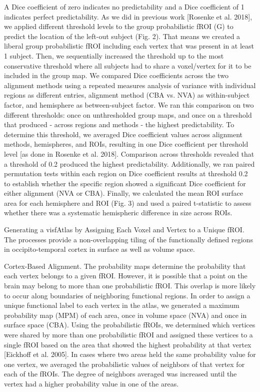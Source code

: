 A Dice coefficient of zero indicates no predictability and a Dice coefficient of
1 indicates perfect predictability.
%
As we did in previous work [Rosenke et al. 2018], we applied different threshold
levels to the group probabilistic fROI (G) to predict the location of the
left-out subject (Fig. 2).
%
That means we created a liberal group probabilistic fROI including each vertex
that was present in at least 1 subject.
%
Then, we sequentially increased the threshold up to the most conservative
threshold where all subjects had to share a voxel/vertex for it to be included
in the group map.
%
We compared Dice coefficients across the two alignment methods using a repeated
measures analysis of variance with individual regions as different entries,
alignment method (CBA vs. NVA) as within-subject factor, and hemisphere as
between-subject factor.
%
We ran this comparison on two different thresholds:
%
once on unthresholded group maps, and once on a threshold that produced - across
regions and methods - the highest predictability.
%
To determine this threshold, we averaged Dice coefficient values across
alignment methods, hemispheres, and ROIs, resulting in one Dice coefficient per
threshold level [as done in Rosenke et al. 2018].
%
Comparison across thresholds revealed that a threshold of 0.2 produced the
highest predictability.
%
Additionally, we ran paired permutation tests within each region on Dice
coefficient results at threshold 0.2 to establish whether the specific region
showed a significant Dice coefficient for either alignment (NVA or CBA).
%
Finally, we calculated the mean ROI surface area for each hemisphere
and ROI (Fig. 3) and used a paired t-statistic to assess whether there was a
systematic hemispheric difference in size across ROIs.

Generating a visfAtlas by Assigning Each Voxel and Vertex to a Unique fROI.
%
The processes provide a non-overlapping tiling of the
functionally defined regions in occipito-temporal cortex in surface as well as
volume space.
%

Cortex-Based Alignment.
%
The probability maps determine the probability that each vertex belongs to a
given fROI.
%
However, it is possible that a point on the brain may belong to more than one
probabilistic fROI.
%
This overlap is more likely to occur along boundaries of neighboring functional
regions.
%
In order to assign a unique functional label to each vertex in the atlas, we
generated a maximum probability map (MPM) of each area, once in volume space
(NVA) and once in surface space (CBA).
%
Using the probabilistic fROIs, we determined which vertices were shared by more
than one probabilistic fROI and assigned these vertices to a single fROI based
on the area that showed the highest probability at that vertex [Eickhoff et al.
2005].
%
In cases where two areas held the same probability value for one vertex, we
averaged the probabilistic values of neighbors of that vertex for each of the
fROIs.
%
The degree of neighbors averaged was increased until the vertex had a higher
probability value in one of the areas.


